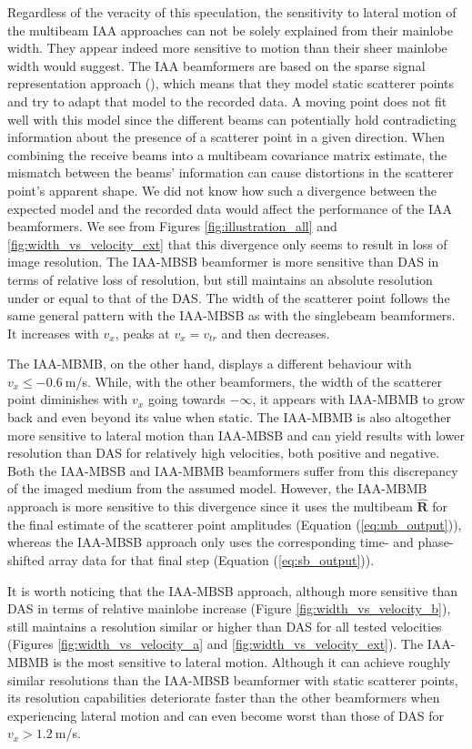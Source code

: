 Regardless of the veracity of this speculation, the sensitivity to lateral motion of the multibeam IAA approaches can not be solely explained from their mainlobe width. They appear indeed more sensitive to motion than their sheer mainlobe width would suggest.
The IAA beamformers are based on the sparse signal representation approach (\cite{Yardibi_nonparametric_IAA}), which means that they model static scatterer points and try to adapt that model to the recorded data.
A moving point does not fit well with this model since the different beams can potentially hold contradicting information about the presence of a scatterer point in a given direction.
When combining the receive beams into a multibeam covariance matrix estimate, the mismatch between the beams' information can cause distortions in the scatterer point's apparent shape.
We did not know how such a divergence between the expected model and the recorded data would affect the performance of the IAA beamformers.
We see from Figures \ref{fig:illustration_all} and \ref{fig:width_vs_velocity_ext} that this divergence only seems to result in loss of image resolution.
The IAA-MBSB beamformer is more sensitive than DAS in terms of relative loss of resolution, but still maintains an absolute resolution under or equal to that of the DAS.
The width of the scatterer point follows the same general pattern with the IAA-MBSB as with the singlebeam beamformers.
It increases with $v_x$, peaks at $v_x = v_{tr}$ and then decreases.

The IAA-MBMB, on the other hand, displays a different behaviour with $v_x \leq -0.6~$m/s. While, with the other beamformers, the width of the scatterer point diminishes with $v_x$ going towards $-\infty$, it appears with IAA-MBMB to grow back and even beyond its value when static.
The IAA-MBMB is also altogether more sensitive to lateral motion than IAA-MBSB and can yield results with lower resolution than DAS for relatively high velocities, both positive and negative.
Both the IAA-MBSB and IAA-MBMB beamformers suffer from this discrepancy of the imaged medium from the assumed model. However, the IAA-MBMB approach is more sensitive to this divergence since it uses the multibeam $\boldsymbol{\hat{R}}$ for the final estimate of the scatterer point amplitudes (Equation (\ref{eq:mb_output})), whereas the IAA-MBSB approach only uses the corresponding time- and phase-shifted array data for that final step (Equation (\ref{eq:sb_output})).


\iffalse

It is worth noticing that the IAA-MBSB approach, although more sensitive than DAS in terms of relative mainlobe increase (Figure \ref{fig:width_vs_velocity_b}), still maintains a resolution similar or higher than DAS for all tested velocities (Figures \ref{fig:width_vs_velocity_a} and \ref{fig:width_vs_velocity_ext}).
The IAA-MBMB is the most sensitive to lateral motion. Although it can achieve roughly similar resolutions than the IAA-MBSB beamformer with static scatterer points, its resolution capabilities deteriorate faster than the other beamformers when experiencing lateral motion and can even become worst than those of DAS for $v_x > 1.2~$m/s.

